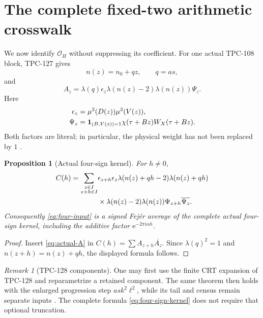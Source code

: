 \documentclass[11pt]{article}
\newtheorem{proposition}[theorem]{Proposition}
\theoremstyle{definition}
\theoremstyle{remark}
\newtheorem{remark}[theorem]{Remark}
\newcommand{\e}{\mathrm e}
\newcommand{\one}{\mathbf 1}
\begin{document}
\section{The complete fixed-two arithmetic crosswalk}

We now identify \(\mathcal O_H\) without suppressing its coefficient.
For one actual TPC-108 block, TPC-127 gives
\[
 n(z)=n_0+qz,\qquad q=as,
\]
and
\begin{equation}
 A_z=
 \lambda(q)\epsilon_z
 \lambda(n(z)-2)\lambda(n(z))\Psi_z.
\label{eq:actual-A}
\end{equation}
Here
\begin{align}
 \epsilon_z
 &=
 \mu^2(D(z))\mu^2(V(z)),\notag\\
 \Psi_z
 &=
 \one_{(B,V(z))=1}
 \chi(\tau+Bz)W_X(\tau+Bz).
\label{eq:epsilon-Psi}
\end{align}
Both factors are literal; in particular, the physical weight has not
been replaced by \(1\) \citep{WangTPC127}.

\begin{proposition}[Actual four-sign kernel]
\label{prop:four-sign}
For \(h\ne0\),
\begin{align}
 C(h)
 =\sum_{\substack{z\in I\\z+h\in I}}
 &\epsilon_{z+h}\epsilon_z
 \lambda(n(z)+qh-2)\lambda(n(z)+qh)
\notag\\
 &\times
 \lambda(n(z)-2)\lambda(n(z))
 \Psi_{z+h}\overline{\Psi_z}.
\label{eq:four-sign-kernel}
\end{align}
Consequently \eqref{eq:four-input} is a signed Fej\'er average of
the complete actual four-sign kernel, including the additive factor
\(\e^{-2\pi i\alpha h}\).
\end{proposition}

\begin{proof}
Insert \eqref{eq:actual-A} in
\(C(h)=\sum A_{z+h}\overline{A_z}\).  Since
\(\lambda(q)^2=1\) and \(n(z+h)=n(z)+qh\), the displayed formula
follows.
\end{proof}

\begin{remark}[TPC-128 components]
One may first use the finite CRT expansion of TPC-128 and
reparametrize a retained component.  The same theorem then holds
with the enlarged progression step \(ask^2\ell^2\), while its tail
and census remain separate inputs \citep{WangTPC128}.  The complete
formula \eqref{eq:four-sign-kernel} does not require that optional
truncation.
\end{remark}
\end{document}
